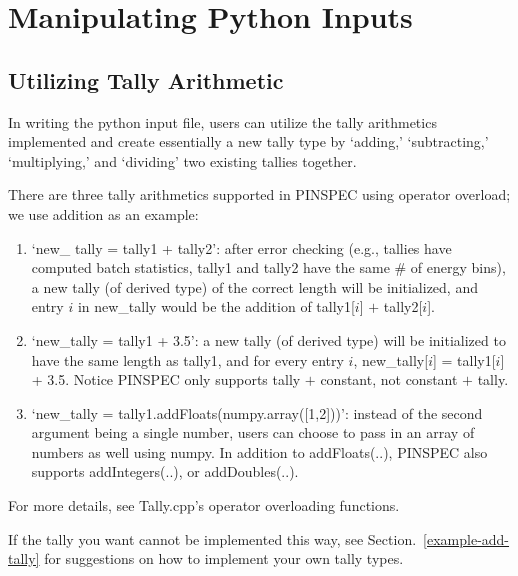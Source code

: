 \documentclass[titlepage]{article}
\begin{document}
\clearpage
\section{Manipulating Python Inputs}\label{python}
\subsection{Utilizing Tally Arithmetic}
In writing the python input file, users can utilize the tally arithmetics implemented and create essentially a new tally type by `adding,' `subtracting,' `multiplying,' and `dividing' two existing tallies together. 

There are three tally arithmetics supported in PINSPEC using operator overload; we use addition as an example:
\begin{enumerate}
\item `new\_ tally = tally1 + tally2': after error checking (e.g., tallies have computed batch statistics, tally1 and tally2 have the same \# of energy bins), a new tally (of derived type) of the correct length will be initialized, and entry $i$ in new\_tally would be the addition of tally1[$i$] $+$ tally2[$i$]. 
 
\item `new\_tally = tally1 + 3.5': a new tally (of derived type) will be initialized to have the same length as tally1, and for every entry $i$, new\_tally[$i$] = tally1[$i$] + 3.5. Notice PINSPEC only supports tally $+$ constant, not constant $+$ tally. 

\item `new\_tally = tally1.addFloats(numpy.array([1,2]))': instead of the second argument being a single number, users can choose to pass in an array of numbers as well using numpy. In addition to addFloats(..), PINSPEC also supports addIntegers(..), or addDoubles(..). 
\end{enumerate}
For more details, see Tally.cpp's operator overloading functions. 

If the tally you want cannot be implemented this way, see Section.~\ref{example-add-tally} for suggestions on how to implement your own tally types. 


\clearpage
\end{document}
